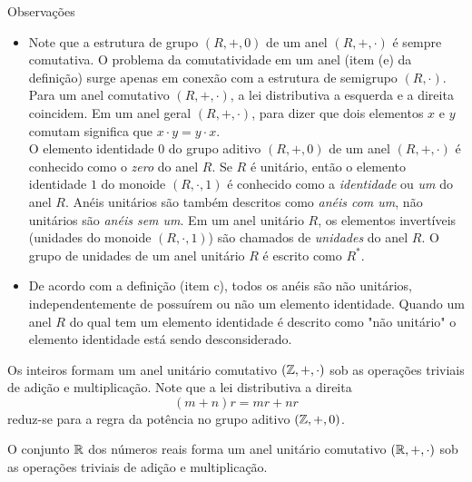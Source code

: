 \begin{mymdframed}{Observações}
  \begin{itemize}
    \item Note que a estrutura de grupo $(R,+,0)$ de um anel $(R,+,\cdot)$ é sempre comutativa. O problema da comutatividade em um anel (item (e) da definição) surge apenas em conexão com a estrutura de semigrupo $(R,\cdot)$. Para um anel comutativo $(R, +, \cdot)$, a lei distributiva a esquerda e a direita coincidem. Em um anel geral $(R,+,\cdot)$, para dizer que dois elementos $x$ e $y$ comutam significa que $x\cdot y = y \cdot x $.\\ 
    O elemento identidade $0$ do grupo aditivo $(R, +, 0)$ de um anel $(R, +, \cdot)$ é conhecido como o \emph{zero} do anel $R$. Se $R$ é unitário, então o elemento identidade $1$ do monoide $(R,\cdot , 1)$ é conhecido como a \emph{identidade} ou \emph{um} do anel $R$. Anéis unitários são também descritos como \emph{anéis com um}, não unitários são \emph{anéis sem um}. Em um anel unitário $R$, os elementos invertíveis (unidades do monoide $(R,\cdot , 1)$) são chamados de \emph{unidades} do anel $R$. O grupo de unidades de um anel unitário $R$ é escrito como $R^{*}.$
    \item De acordo com a definição (item c), todos os anéis são não unitários, independentemente de possuírem ou não um elemento identidade. Quando um anel $R$ do qual tem um elemento identidade é descrito como "não unitário" o elemento identidade está sendo desconsiderado.
  \end{itemize}
\end{mymdframed}

\begin{exmp}[Inteiros]
  Os inteiros formam um anel unitário comutativo $(\mathbb{Z} , + , \cdot)$ sob as operações triviais de adição e multiplicação. Note que a lei distributiva a direita $$(m + n)r = mr + nr$$ reduz-se para a regra da potência no grupo aditivo $(\mathbb{Z}, + , 0)$.
\end{exmp}

\begin{exmp}[Reais]
  O conjunto $\mathbb{R}$ dos números reais forma um anel unitário comutativo $(\mathbb{R}, +, \cdot)$ sob as operações triviais de adição e multiplicação.
\end{exmp}


